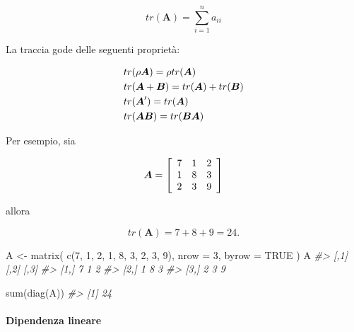 \documentclass[
  11pt,
]{krantz}
\makeatletter
\newenvironment{Shaded}{\begin{snugshade}}{\end{snugshade}}
\newcommand{\AttributeTok}[1]{\textcolor[rgb]{0.61,0.61,0.61}{#1}}
\newcommand{\CommentTok}[1]{\textcolor[rgb]{0.37,0.37,0.37}{\textit{#1}}}
\newcommand{\ConstantTok}[1]{\textcolor[rgb]{0,0,0}{#1}}
\newcommand{\DecValTok}[1]{\textcolor[rgb]{0.06,0.06,0.06}{#1}}
\newcommand{\FunctionTok}[1]{\textcolor[rgb]{0,0,0}{#1}}
\newcommand{\NormalTok}[1]{#1}
\newcommand{\OtherTok}[1]{\textcolor[rgb]{0.37,0.37,0.37}{#1}}
\newenvironment{kframe}{%
\medskip{}
\setlength{\fboxsep}{.8em}
 \def\at@end@of@kframe{}%
 \ifinner\ifhmode%
  \def\at@end@of@kframe{\end{minipage}}%
  \begin{minipage}{\columnwidth}%
 \fi\fi%
 \def\FrameCommand##1{\hskip\@totalleftmargin \hskip-\fboxsep
 \colorbox{shadecolor}{##1}\hskip-\fboxsep
     \hskip-\linewidth \hskip-\@totalleftmargin \hskip\columnwidth}%
 \MakeFramed {\advance\hsize-\width
   \@totalleftmargin\z@ \linewidth\hsize
   \@setminipage}}%
 {\par\unskip\endMakeFramed%
 \at@end@of@kframe}
\renewenvironment{Shaded}{\begin{kframe}}{\end{kframe}}
\theoremstyle{definition}
\theoremstyle{definition}
\theoremstyle{definition}
\theoremstyle{definition}
\theoremstyle{remark}
\makeatother
\begin{document}
\[
tr(\boldsymbol{A}) = \sum_{i=1}^{n} a_{ii}
\]

La traccia gode delle seguenti proprietà:

\[
\begin{aligned}
&tr(\rho \boldsymbol{A}) = \rho tr( \boldsymbol{A}) \notag \\
&tr(\boldsymbol{A} + \boldsymbol{B}) =  tr( \boldsymbol{A})+tr( \boldsymbol{B}) \notag \\
&tr(\boldsymbol{A}') =  tr( \boldsymbol{A}) \notag \\
&tr(\boldsymbol{AB}) =  tr( \boldsymbol{BA}) \notag\end{aligned}
\]

Per esempio, sia

\[
\boldsymbol{A} =  \left[ \begin{array}{c c c}
7 & 1 & 2\\
1 & 8 & 3\\
2 & 3 & 9 \end{array} \right]
\]

allora

\[
tr(\boldsymbol{A}) = 7 + 8 + 9 = 24.
\]

\begin{Shaded}
\begin{Highlighting}[]
\NormalTok{A }\OtherTok{\textless{}{-}} \FunctionTok{matrix}\NormalTok{(}
  \FunctionTok{c}\NormalTok{(}\DecValTok{7}\NormalTok{, }\DecValTok{1}\NormalTok{, }\DecValTok{2}\NormalTok{, }\DecValTok{1}\NormalTok{, }\DecValTok{8}\NormalTok{, }\DecValTok{3}\NormalTok{, }\DecValTok{2}\NormalTok{, }\DecValTok{3}\NormalTok{, }\DecValTok{9}\NormalTok{),}
  \AttributeTok{nrow =} \DecValTok{3}\NormalTok{,}
  \AttributeTok{byrow =} \ConstantTok{TRUE}
\NormalTok{)}
\NormalTok{A}
\CommentTok{\#\textgreater{}      [,1] [,2] [,3]}
\CommentTok{\#\textgreater{} [1,]    7    1    2}
\CommentTok{\#\textgreater{} [2,]    1    8    3}
\CommentTok{\#\textgreater{} [3,]    2    3    9}
\end{Highlighting}
\end{Shaded}

\begin{Shaded}
\begin{Highlighting}[]
\FunctionTok{sum}\NormalTok{(}\FunctionTok{diag}\NormalTok{(A))}
\CommentTok{\#\textgreater{} [1] 24}
\end{Highlighting}
\end{Shaded}

\hypertarget{dipendenza-lineare}{%
\paragraph{Dipendenza lineare}\label{dipendenza-lineare}}
\end{document}
